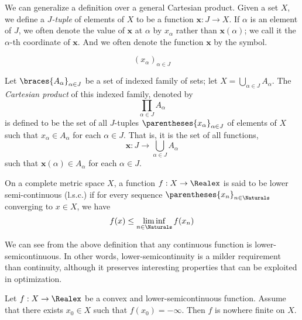 We can generalize a definition over a general Cartesian product. Given a set $X$, we define a \textit{$J$-tuple} of elements of $X$ to be a function $\mathbf{x}:J\rightarrow X$. If $\alpha$ is an element of $J$, we often denote the value of $\mathbf{x}$ at $\alpha$ by $x_\alpha$ rather than $\mathbf{x}(\alpha)$; we call it the $\alpha$-th coordinate of $\mathbf{x}$. And we often denote the function $\mathbf{x}$ by the symbol.

\begin{equation*}
	(x_\alpha)_{\alpha \in J}
\end{equation*} 

Let $\braces{A_\alpha}_{\alpha \in J}$ be a set of indexed family of sets; let $X=\bigcup_{\alpha \in J}A_{\alpha}$. The \textit{Cartesian product} of this indexed family, denoted by
\begin{equation*}
	\prod_{\alpha \in J}A_\alpha
\end{equation*}	
is defined to be the set of all $J$-tuples $\parentheses{x_\alpha}_{\alpha \in J}$ of elements of $X$ such that $x_\alpha \in A_\alpha$ for each $\alpha \in J$. That is, it is the set of all functions,
\begin{equation*}
\mathbf{x}: J\rightarrow \bigcup_{\alpha \in J} A_\alpha
\end{equation*}
such that $\mathbf{x}(\alpha)\in A_\alpha$ for each $\alpha \in J$.


\begin{definition}
	On a complete metric space $X$, a function $f: X\rightarrow\Realex$ is said to be lower semi-continuous (l.s.c.) if for every sequence $\parentheses{x_n}_{n\in\Naturals}$ converging to $x\in X$, we have 
	\begin{equation*}
	f(x)\leq \liminf_{n\in \Naturals} f(x_n)
	\end{equation*}
\end{definition}

We can see from the above definition that any continuous function is lower-semicontinuous. In other words, lower-semicontinuity is a milder requirement than continuity, although it preserves interesting properties that can be exploited in optimization.  

\begin{proposition}
	Let $f: X \rightarrow \Realex$ be a convex and lower-semicontinuous function.
	Assume that there exists $x_0 \in X$ such that $f(x_0) = -\infty$. Then $f$ is nowhere finite on $X$.
\end{proposition} 



